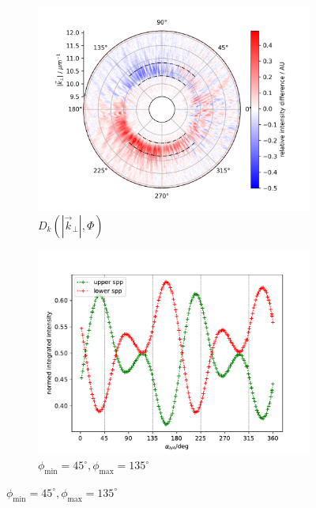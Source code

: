 \documentclass[titlepage,  ngerman]{article}
\begin{document}
\begin{figure}
			\begin{subfigure}[b]{0.5\textwidth}
				\centering
				\includegraphics[width=\textwidth]{figures/spin_hall/diff_mid.png}
				\caption{$D_k\left(|\vec{k}_\perp|, \Phi\right)$}
				\label{fig:diff_mid}
			\end{subfigure}
			\hfill
			\begin{subfigure}[b]{0.49\textwidth}
				\centering
				\includegraphics[width=\textwidth]{figures/spin_hall/intensity_mid.pdf}
				\caption{$\phi_\mathrm{min} =45^\circ, \phi_\mathrm{max}=135^\circ$}
				\label{fig:intensity_mid}
			\end{subfigure}
			

\end{figure}
\end{document}
